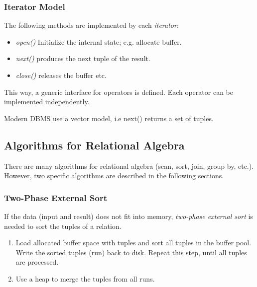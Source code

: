 \subsubsection{Iterator Model}

The following methods are implemented by each \emph{iterator}:
\begin{itemize}
\item \emph{open()} Initialize the internal state; e.g. allocate buffer.
\item \emph{next()} produces the next tuple of the result.
\item \emph{close()} releases the buffer etc.
\end{itemize}

This way, a generic interface for operators is defined. Each operator can be implemented independently.

\begin{note}
Modern DBMS use a vector model, i.e next() returns a set of tuples.
\end{note}




\subsection{Algorithms for Relational Algebra}

There are many algorithms for relational algebra (scan, sort, join, group by, etc.). However, two specific algorithms are described in the following sections.



\subsubsection{Two-Phase External Sort}

If the data (input and result) does not fit into memory, \emph{two-phase external sort} is needed to sort the tuples of a relation.

\begin{enumerate}
\item Load allocated buffer space with tuples and sort all tuples in the buffer pool. Write the sorted tuples (run) back to disk. Repeat this step, until all tuples are processed.
\item Use a heap to merge the tuples from all runs.
\end{enumerate}

